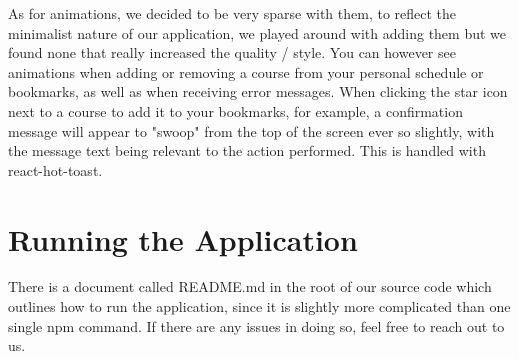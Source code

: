 \documentclass[12pt]{article}
\begin{document}
As for animations, we decided to be very sparse with them, to reflect the minimalist nature of our application, we played around with adding them but we found none that really increased the quality / style. You can however see animations when adding or removing a course from your personal schedule or bookmarks, as well as when receiving error messages. When clicking the star icon next to a course to add it to your bookmarks, for example, a confirmation message will appear to "swoop" from the top of the screen ever so slightly, with the message text being relevant to the action performed.  This is handled with react-hot-toast.

\section{Running the Application}

There is a document called README.md in the root of our source code which outlines how to run the application, since it is slightly more complicated than one single npm command.  If there are any issues in doing so, feel free to reach out to us.
\end{document}
